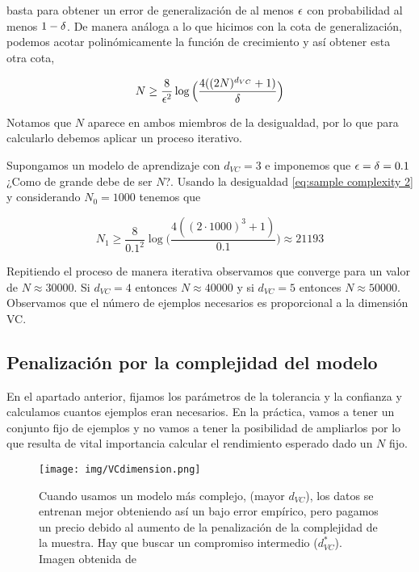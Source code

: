     \noindent basta para obtener un error de generalización de al menos $\epsilon$ con probabilidad al menos $1-\delta$. De manera análoga a lo que hicimos con la cota de generalización, podemos acotar polinómicamente la función de crecimiento y así obtener esta otra cota,
    
    \begin{equation}\label{eq:sample complexity 2}
        N \geq \frac{8}{\epsilon^2}\log\Big( \frac{4((2N)^{d_{VC}} + 1)}{\delta} \Big)
    \end{equation}

    Notamos que $N$ aparece en ambos miembros de la desigualdad, por lo que para calcularlo debemos aplicar un proceso iterativo. \\
    
    \begin{ejemplo}
    Supongamos un modelo de aprendizaje con $d_{VC} = 3$ e imponemos que $\epsilon = \delta = 0.1$ ¿Como de grande debe de ser $N$?. Usando la desigualdad \eqref{eq:sample complexity 2}   y considerando $N_0 = 1000$ tenemos que 
    
    \begin{equation}
        N_1 \geq \frac{8}{0.1^2}\log\Big( \frac{4((2 \cdot 1000)^3 + 1)}{0.1} \Big) \approx 21193
    \end{equation}
    \end{ejemplo}
    
    \noindent Repitiendo el proceso de manera iterativa observamos que converge para un valor de $N \approx 30000$. Si $d_{VC} = 4$ entonces $N \approx 40000$ y si $d_{VC} = 5$ entonces $N \approx 50000$. Observamos que el número de ejemplos necesarios es proporcional a la dimensión VC. \\
    
    
\subsection{Penalización por la complejidad del modelo}
    
    En el apartado anterior, fijamos los parámetros de la tolerancia y la confianza y calculamos cuantos ejemplos eran necesarios. En la práctica, vamos a tener un conjunto fijo de ejemplos y no vamos a tener la posibilidad de ampliarlos por lo que resulta de vital importancia calcular el rendimiento esperado dado un $N$ fijo. \\
    
    \begin{figure}[H]
        \centering
        \texttt{[image: img/VCdimension.png]}
        \caption{Cuando usamos un modelo más complejo, (mayor $d_{VC}$), los datos se entrenan mejor obteniendo así un bajo error empírico, pero pagamos un precio debido al aumento de la penalización de la complejidad de la muestra. Hay que buscar un compromiso intermedio ($d_{VC}^*$). Imagen obtenida de \cite{data}}
        \label{fig:my_label}
    \end{figure}
    
